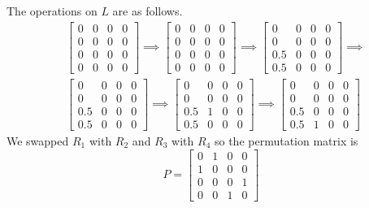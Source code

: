 \documentclass{article}
\begin{document}
The operations on $L$ are as follows.
\begin{align*}
    &\begin{bmatrix}
        0 & 0 & 0 & 0 \\
        0 & 0 & 0 & 0 \\
        0 & 0 & 0 & 0 \\
        0 & 0 & 0 & 0
    \end{bmatrix} \implies 
    \begin{bmatrix}
        0 & 0 & 0 & 0 \\
        0 & 0 & 0 & 0 \\
        0 & 0 & 0 & 0 \\
        0 & 0 & 0 & 0
    \end{bmatrix} \implies 
    \begin{bmatrix}
        0 & 0 & 0 & 0 \\
        0 & 0 & 0 & 0 \\
        0.5 & 0 & 0 & 0 \\
        0.5 & 0 & 0 & 0
    \end{bmatrix} \implies \\
    &\begin{bmatrix}
        0 & 0 & 0 & 0 \\
        0 & 0 & 0 & 0 \\
        0.5 & 0 & 0 & 0 \\
        0.5 & 0 & 0 & 0
    \end{bmatrix} \implies
    \begin{bmatrix}
        0 & 0 & 0 & 0 \\
        0 & 0 & 0 & 0 \\
        0.5 & 1 & 0 & 0 \\
        0.5 & 0 & 0 & 0
    \end{bmatrix} \implies 
    \begin{bmatrix}
        0 & 0 & 0 & 0 \\
        0 & 0 & 0 & 0 \\
        0.5 & 0 & 0 & 0 \\
        0.5 & 1 & 0 & 0
    \end{bmatrix} 
\end{align*}
We swapped $R_1$ with $R_2$ and $R_3$ with $R_4$ so the permutation matrix is 
\[
    P = \begin{bmatrix}
        0 & 1 & 0 & 0 \\
        1 & 0 & 0 & 0 \\
        0 & 0 & 0 & 1 \\
        0 & 0 & 1 & 0
    \end{bmatrix}
\]
\end{document}

